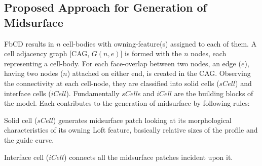 \subsection{Proposed Approach for Generation of Midsurface} \label{cagd:sec:compmids}
FbCD results in $n$ cell-bodies with owning-feature(s) assigned to each of them. A cell adjacency graph [CAG, $G(n,e)$] is formed with the $n$ nodes, each representing a cell-body. For each face-overlap between two nodes, an edge ($e$), having two nodes ($n$) attached on either end, is created in the CAG. Observing the connectivity at each cell-node, they are classified into solid cells ($sCell$) and interface cells ($iCell$). 
Fundamentally $sCell$s and $iCell$  are the building blocks of the model. Each contributes to the generation of midsurface by following rules:

\begin{myrule}
\label{rule:scell}
Solid cell ($sCell$) generates midsurface patch looking at its morphological characteristics of its owning Loft feature, basically relative sizes of the profile and the guide curve.
\end{myrule}
\begin{myrule}
\label{rule:icell}
Interface cell ($iCell$) connects all the midsurface patches incident upon it.
\end{myrule}

